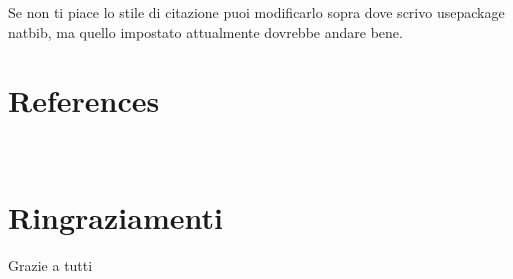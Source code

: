 \documentclass[12pt,a4paper,twoside]{book}
\begin{document}
Se non ti piace lo stile di citazione puoi modificarlo sopra dove scrivo usepackage natbib, ma quello impostato attualmente dovrebbe andare bene.



\renewcommand{\bibsection}{}
\chapter*{References}

\newpage

\renewcommand{\appendixtocname}{Appendices}
{}

\newpage~\newpage
\chapter*{Ringraziamenti}
Grazie a tutti
\end{document}
